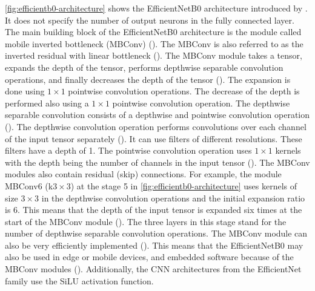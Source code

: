 \documentclass{BachelorBUI}
\begin{document}
    \autoref{fig:efficientb0-architecture} shows the EfficientNetB0 architecture introduced by \textcite{Tan:2019}. It does not specify the number of output neurons in the fully connected layer. The main building block of the EfficientNetB0 architecture is the module called mobile inverted bottleneck (MBConv) (\cite{Tan:2019}). The MBConv is also referred to as the inverted residual with linear bottleneck (\cite{Sandler:2019}). The MBConv module takes a tensor, expands the depth of the tensor, performs depthwise separable convolution operations, and finally decreases the depth of the tensor (\cite{Sandler:2019}). The expansion is done using $1 \times 1$ pointwise convolution operations. The decrease of the depth is performed also using a $1 \times 1$ pointwise convolution operation. The depthwise separable convolution consists of a depthwise and pointwise convolution operation (\cite{Chollet:2017}). The depthwise convolution operation performs convolutions over each channel of the input tensor separately (\cite{Chollet:2017}). It can use filters of different resolutions. These filters have a depth of 1. The pointwise convolution operation uses $1 \times 1$ kernels with the depth being the number of channels in the input tensor (\cite{Chollet:2017}). The MBConv modules also contain residual (skip) connections. For example, the module MBConv6 (k$3\times3$) at the stage 5 in \autoref{fig:efficientb0-architecture} uses kernels of size $3 \times 3$ in the depthwise convolution operations and the initial expansion ratio is 6. This means that the depth of the input tensor is expanded six times at the start of the MBConv module (\cite{Sandler:2019}). The three layers in this stage stand for the number of depthwise separable convolution operations. The MBConv module can also be very efficiently implemented (\cite{Sandler:2019}). This means that the EfficientNetB0 may also be used in edge or mobile devices, and embedded software because of the MBConv modules (\cite{Sandler:2019}). Additionally, the CNN architectures from the EfficientNet family use the SiLU activation function.
\end{document}
